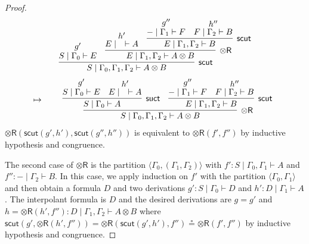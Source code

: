 \documentclass[sn-mathphys-num]{sn-jnl}%
\newcommand{\GG}{\Gamma}
\newcommand{\vd}{\vdash}
\newcommand{\tr}{\otimes\mathsf{R}}
\newcommand{\ot}{\otimes}
\newcommand{\mf}[1]{\mathsf{#1}}
\newcommand{\scut}[2]{\mf{scut} (#1 , #2)}
\theoremstyle{thmstyleone}%
\theoremstyle{thmstyletwo}%
\theoremstyle{thmstylethree}%
\begin{document}
\begin{proof}
\begin{displaymath}
\begin{array}{lc}
\begin{array}{c}
      \infer[\mf{scut}]{S \mid \GG_0 , \GG_1 , \GG_2 \vd A \ot B}{
      \deduce{S \mid \GG_0 \vd E}{g'}
      &
      \infer[\tr]{E \mid \GG_1 , \GG_2 \vd A \ot B}{
        \deduce{E \mid \quad \vd A}{h'}
        &
        \infer[\mf{scut}]{E \mid \GG_1, \GG_2 \vd B}{
        \deduce{{-}\mid \GG_1 \vd F}{g''}
        &
        \deduce{F \mid \GG_2 \vd B}{h''}
      }
      }
    }
    \end{array}
  \end{array}
  \end{displaymath}
  \begin{displaymath}
  \begin{array}{lr}
    \mapsto&
    \quad
    \begin{array}{c}
      \infer[\tr]{S \mid \GG_0 , \GG_1 , \GG_2 \vd A \ot B}{
      \infer[\mf{suct}]{S \mid \GG_0 \vd A}{
        \deduce{S \mid \GG_0 \vd E}{g'}
        &
        \deduce{E \mid \quad \vd A}{h'}
      }
      &
      \infer[\mf{scut}]{E \mid \GG_1, \GG_2 \vd B}{
        \deduce{{-}\mid \GG_1 \vd F}{g''}
        &
        \deduce{F \mid \GG_2 \vd B}{h''}
      }
    }
    \end{array}
  \end{array}
\end{displaymath}
$\tr (\scut{g'}{h'} , \scut{g''}{h''})$ is equivalent to $\tr (f' ,f'')$ by inductive hypothesis and congruence.

The second case of $\tr$ is the partition $\langle \GG_0, (\GG_1 , \GG_2) \rangle$ with $f' : S \mid \GG_0 , \GG_1 \vd A$ and $f'' : {-} \mid \GG_2 \vd B$.
In this case, we apply induction on $f'$ with the partition $\langle \GG_0 , \GG_1 \rangle$ and then obtain a formula $D$ and two derivations $g' : S \mid \GG_0 \vd D$ and $h' : D \mid \GG_1 \vd A$.
The interpolant formula is $D$ and the desired derivations are $g = g'$ and $h = \tr (h' , f'') : D \mid \GG_1 , \GG_2 \vd A \ot B$ where $\scut{g'}{\tr (h', f'')} = \tr (\scut{g'}{h'} , f'') \circeq \tr (f' , f'')$ by inductive hypothesis and congruence.


\end{proof}
\end{document}
